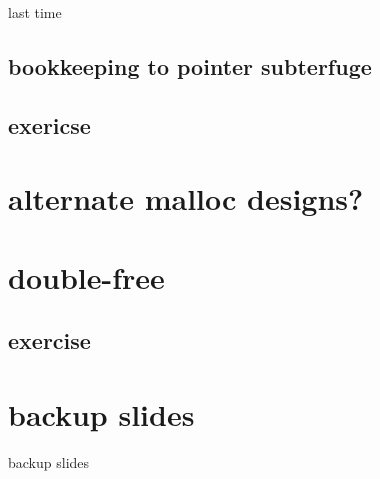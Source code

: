 \date{}
\title{}
\date{}

\begin{frame}
    \titlepage
\end{frame}



\begin{frame}{last time}
\end{frame}

\subsection{bookkeeping to pointer subterfuge}


\subsection{exericse}


\section{alternate malloc designs?}


\section{double-free}


\subsection{exercise}






\section{backup slides}
\begin{frame}{backup slides}
\end{frame}


